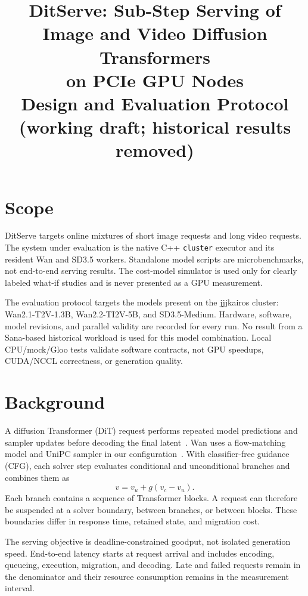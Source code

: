 \documentclass[11pt,a4paper]{article}
\title{DitServe: Sub-Step Serving of Image and Video Diffusion Transformers\\on PCIe GPU Nodes\\[0.3em]
\large Design and Evaluation Protocol (working draft; historical results removed)}
\author{}
\date{}
\begin{document}
\maketitle

\section{Scope}
DitServe targets online mixtures of short image requests and long video requests.
The system under evaluation is the native C++ \texttt{cluster} executor and its
resident Wan and SD3.5 workers. Standalone model scripts are microbenchmarks,
not end-to-end serving results. The cost-model simulator is used only for
clearly labeled what-if studies and is never presented as a GPU measurement.

The evaluation protocol targets the models present on the jjjkairos cluster:
Wan2.1-T2V-1.3B, Wan2.2-TI2V-5B, and SD3.5-Medium. Hardware, software, model
revisions, and parallel validity are recorded for every run. No result from a
Sana-based historical workload is used for this model combination. Local
CPU/mock/Gloo tests validate software contracts, not GPU speedups, CUDA/NCCL
correctness, or generation quality.

\section{Background}
A diffusion Transformer (DiT) request performs repeated model predictions and
sampler updates before decoding the final latent~\cite{ho2020ddpm,rombach2022ldm,peebles2023dit}.
Wan uses a flow-matching model and UniPC sampler in our
configuration~\cite{wan2025}. With classifier-free guidance (CFG), each solver
step evaluates conditional and unconditional branches and combines them as
\begin{equation}
  v = v_u + g(v_c-v_u).
\end{equation}
Each branch contains a sequence of Transformer blocks. A request can therefore
be suspended at a solver boundary, between branches, or between blocks. These
boundaries differ in response time, retained state, and migration cost.

The serving objective is deadline-constrained goodput, not isolated generation
speed. End-to-end latency starts at request arrival and includes encoding,
queueing, execution, migration, and decoding. Late and failed requests remain
in the denominator and their resource consumption remains in the measurement
interval.
\end{document}
